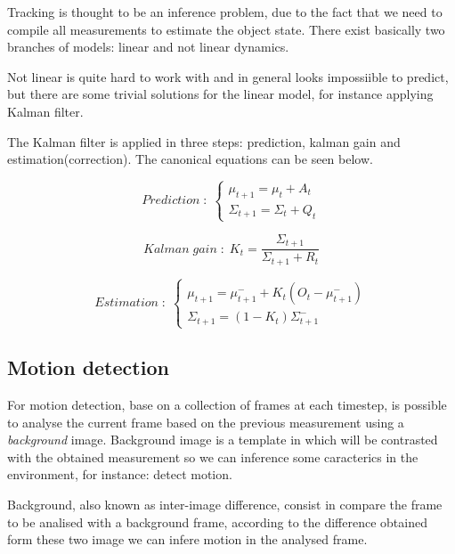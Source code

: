 \documentclass{article}
\begin{document}
Tracking is thought to be an inference problem, due to the fact that we need to compile all measurements to estimate the object state. There exist basically two branches of models: linear and not linear dynamics.

Not linear is quite hard to work with and in general looks impossiible to predict, but there are some trivial solutions for the  linear model, for instance applying Kalman filter.

The Kalman filter is applied in three steps: prediction, kalman gain and estimation(correction). The canonical equations can be seen below.

\begin{equation} \label{eq:prediction}
  Prediction\;:\; 
  \left\{ 
    \begin{array}{ c }
      \mu_{t+1} = \mu_t + A_t \\
      \Sigma_{t+1} = \Sigma_t + Q_t
    \end{array}
  \right.
\end{equation}

\begin{equation} \label{eq:kalman_gain}
  Kalman\;gain\;:\; K_t = \frac{\Sigma_{t+1}}{\Sigma_{t+1} + R_t}
\end{equation}

\begin{equation} \label{eq:estimation}
  Estimation\;:\; 
  \left\{ 
    \begin{array}{ c }
      \mu_{t+1} = \mu^{-}_{t+1} + K_t(O_t - \mu^{-}_{t+1}) \\
      \Sigma_{t+1} = (1 - K_t)\Sigma^{-}_{t+1}
    \end{array}
  \right.
\end{equation}

\subsection{Motion detection}

For motion detection, base on a collection of frames at each timestep, is possible to analyse the current frame based on the previous measurement using a \emph{background} image. Background image is a template in which will be contrasted with the obtained measurement so we can inference some caracterics in the environment, for instance: detect motion.

Background, also known as inter-image difference, consist in compare the frame to be analised with a background frame, according to the difference obtained form these two image we can infere motion in the analysed frame. 
\end{document}
